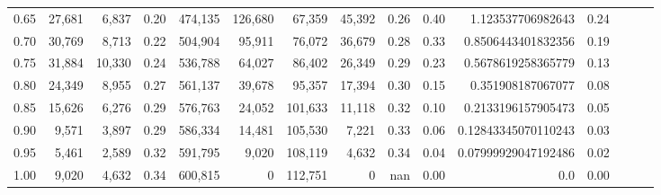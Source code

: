 \begin{tabular}{rrrrrrrrrrrrrrr}
0.65 &  27,681 &   6,837 &  0.20 &  474,135 &  126,680 &   67,359 &   45,392 &  0.26 &  0.40 &    1.123537706982643 &      0.24 \\
0.70 &  30,769 &   8,713 &  0.22 &  504,904 &   95,911 &   76,072 &   36,679 &  0.28 &  0.33 &   0.8506443401832356 &      0.19 \\
0.75 &  31,884 &  10,330 &  0.24 &  536,788 &   64,027 &   86,402 &   26,349 &  0.29 &  0.23 &   0.5678619258365779 &      0.13 \\
0.80 &  24,349 &   8,955 &  0.27 &  561,137 &   39,678 &   95,357 &   17,394 &  0.30 &  0.15 &    0.351908187067077 &      0.08 \\
0.85 &  15,626 &   6,276 &  0.29 &  576,763 &   24,052 &  101,633 &   11,118 &  0.32 &  0.10 &   0.2133196157905473 &      0.05 \\
0.90 &   9,571 &   3,897 &  0.29 &  586,334 &   14,481 &  105,530 &    7,221 &  0.33 &  0.06 &  0.12843345070110243 &      0.03 \\
0.95 &   5,461 &   2,589 &  0.32 &  591,795 &    9,020 &  108,119 &    4,632 &  0.34 &  0.04 &  0.07999929047192486 &      0.02 \\
1.00 &   9,020 &   4,632 &  0.34 &  600,815 &        0 &  112,751 &        0 &   nan &  0.00 &                  0.0 &      0.00 \\
\bottomrule
\end{tabular}
